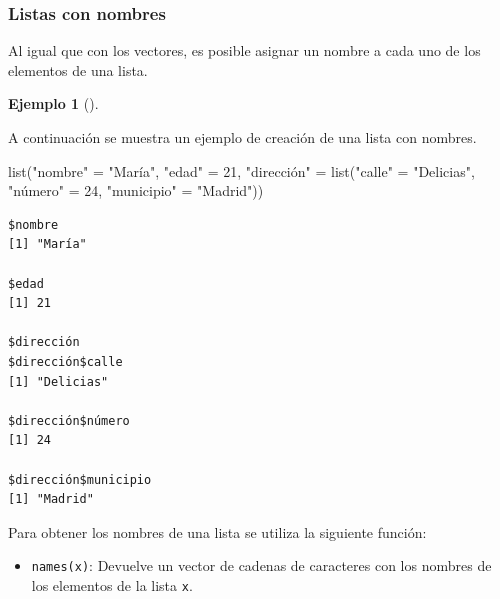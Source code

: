 \documentclass[
  a4paper,
]{scrreport}
\newenvironment{Shaded}{\begin{snugshade}}{\end{snugshade}}
\newcommand{\DecValTok}[1]{\textcolor[rgb]{0.68,0.00,0.00}{#1}}
\newcommand{\FunctionTok}[1]{\textcolor[rgb]{0.28,0.35,0.67}{#1}}
\newcommand{\NormalTok}[1]{\textcolor[rgb]{0.00,0.23,0.31}{#1}}
\newcommand{\OtherTok}[1]{\textcolor[rgb]{0.00,0.23,0.31}{#1}}
\newcommand{\StringTok}[1]{\textcolor[rgb]{0.13,0.47,0.30}{#1}}
\providecommand{\tightlist}{%
  \setlength{\itemsep}{0pt}\setlength{\parskip}{0pt}}\usepackage{longtable,booktabs,array}
\theoremstyle{definition}
\theoremstyle{definition}
\newtheorem{example}{Ejemplo}[chapter]
\theoremstyle{remark}
\begin{document}
\hypertarget{listas-con-nombres}{%
\subsubsection{Listas con nombres}\label{listas-con-nombres}}

Al igual que con los vectores, es posible asignar un nombre a cada uno
de los elementos de una lista.

\leavevmode{}%
\begin{example}[]\label{exm-creacion-listas-nombres}

A continuación se muestra un ejemplo de creación de una lista con
nombres.

\begin{Shaded}
\begin{Highlighting}[]
\FunctionTok{list}\NormalTok{(}\StringTok{"nombre"} \OtherTok{=} \StringTok{"María"}\NormalTok{, }\StringTok{"edad"} \OtherTok{=} \DecValTok{21}\NormalTok{, }\StringTok{"dirección"} \OtherTok{=} \FunctionTok{list}\NormalTok{(}\StringTok{"calle"} \OtherTok{=} \StringTok{"Delicias"}\NormalTok{, }\StringTok{"número"} \OtherTok{=} \DecValTok{24}\NormalTok{, }\StringTok{"municipio"} \OtherTok{=} \StringTok{"Madrid"}\NormalTok{))}
\end{Highlighting}
\end{Shaded}

\begin{verbatim}
$nombre
[1] "María"

$edad
[1] 21

$dirección
$dirección$calle
[1] "Delicias"

$dirección$número
[1] 24

$dirección$municipio
[1] "Madrid"
\end{verbatim}

\end{example}

Para obtener los nombres de una lista se utiliza la siguiente función:

\begin{itemize}
\tightlist
\item
  \texttt{names(x)}: Devuelve un vector de cadenas de caracteres con los
  nombres de los elementos de la lista \texttt{x}.
\end{itemize}
\end{document}
